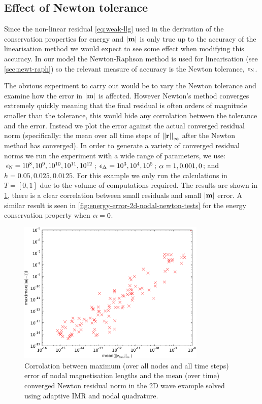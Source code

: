 \subsection{Effect of Newton tolerance}
\label{sec:effect-newt-toler-m-conservation}

Since the non-linear residual \cref{eq:weak-llg} used in the derivation of the conservation properties for energy and $\left|{\boldsymbol{\mathrm{m}}} \right|$ is only true up to the accuracy of the linearisation method we would expect to see some effect when modifying this accuracy.
In our model the Newton-Raphson method is used for linearisation (see \cref{sec:newt-raph}) so the relevant measure of accuracy is the Newton tolerance, $\epsilon_{\mathrm{N}}$.

The obvious experiment to carry out would be to vary the Newton tolerance and examine how the error in $\left|{\boldsymbol{\mathrm{m}}} \right|$ is affected.
However Newton's method converges extremely quickly meaning that the final residual is often orders of magnitude smaller than the tolerance, this would hide any corrolation between the tolerance and the error.
Instead we plot the error against the actual converged residual norm (specifically: the mean over all time steps of $\left| \left| \boldsymbol{\mathrm{r}} \right| \right|_\infty$ after the Newton method has converged).
In order to generate a variety of converged residual norms we run the experiment with a wide range of parameters, we use: $\epsilon_{\mathrm{N}} = 10^{8}, 10^{9}, 10^{10}, 10^{11}, 10^{12}$; $\epsilon_{\Delta_{}} = 10^{3}, 10^{4}, 10^{5}$; $\alpha = 1, 0.001, 0$; and $h = 0.05, 0.025, 0.0125$.
For this example we only run the calculations in $T = [0, 1]$ due to the volume of computations required.
The results are shown in \cref{fig:ml-error-2d-nodal-newton-tests}, there is a clear correlation between small residuals and small $\left|{\boldsymbol{\mathrm{m}}} \right|$ error.
A similar result is seen in \cref{fig:energy-error-2d-nodal-newton-tests} for the energy conservation property when $\alpha = 0$.

\begin{figure}
  \centering
  \includegraphics[width=0.8\textwidth]
  {plots/2d_wave_solution_m_length_newton_res/maxofmlengtherrormaxesvsmeanminofnewtonresiduals.pdf}
  \caption{Corrolation between maximum (over all nodes and all time steps) error of nodal magnetisation lengths and the mean (over time) converged Newton residual norm in the 2D wave example solved using adaptive IMR and nodal quadrature.}
  \label{fig:ml-error-2d-nodal-newton-tests}
\end{figure}


